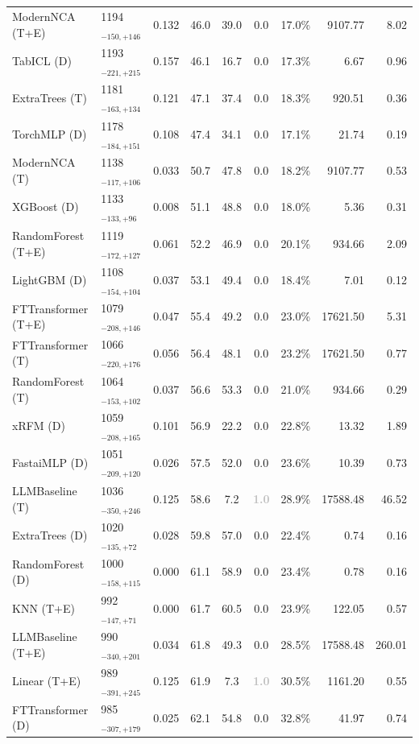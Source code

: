 \begin{tabular}{llcccccrr}
ModernNCA (T+E) & 1194${}_{-150,+146}$ & 0.132 & 46.0 & 39.0 & 0.0 & 17.0\% & 9107.77 & 8.02 \\
TabICL (D) & 1193${}_{-221,+215}$ & 0.157 & 46.1 & 16.7 & 0.0 & 17.3\% & 6.67 & 0.96 \\
ExtraTrees (T) & 1181${}_{-163,+134}$ & 0.121 & 47.1 & 37.4 & 0.0 & 18.3\% & 920.51 & 0.36 \\
TorchMLP (D) & 1178${}_{-184,+151}$ & 0.108 & 47.4 & 34.1 & 0.0 & 17.1\% & 21.74 & 0.19 \\
ModernNCA (T) & 1138${}_{-117,+106}$ & 0.033 & 50.7 & 47.8 & 0.0 & 18.2\% & 9107.77 & 0.53 \\
XGBoost (D) & 1133${}_{-133,+96}$ & 0.008 & 51.1 & 48.8 & 0.0 & 18.0\% & 5.36 & 0.31 \\
RandomForest (T+E) & 1119${}_{-172,+127}$ & 0.061 & 52.2 & 46.9 & 0.0 & 20.1\% & 934.66 & 2.09 \\
LightGBM (D) & 1108${}_{-154,+104}$ & 0.037 & 53.1 & 49.4 & 0.0 & 18.4\% & 7.01 & 0.12 \\
FTTransformer (T+E) & 1079${}_{-208,+146}$ & 0.047 & 55.4 & 49.2 & 0.0 & 23.0\% & 17621.50 & 5.31 \\
FTTransformer (T) & 1066${}_{-220,+176}$ & 0.056 & 56.4 & 48.1 & 0.0 & 23.2\% & 17621.50 & 0.77 \\
RandomForest (T) & 1064${}_{-153,+102}$ & 0.037 & 56.6 & 53.3 & 0.0 & 21.0\% & 934.66 & 0.29 \\
xRFM (D) & 1059${}_{-208,+165}$ & 0.101 & 56.9 & 22.2 & 0.0 & 22.8\% & 13.32 & 1.89 \\
FastaiMLP (D) & 1051${}_{-209,+120}$ & 0.026 & 57.5 & 52.0 & 0.0 & 23.6\% & 10.39 & 0.73 \\
LLMBaseline (T) & 1036${}_{-350,+246}$ & 0.125 & 58.6 & 7.2 & \textcolor{silver}{\textbf{1.0}} & 28.9\% & 17588.48 & 46.52 \\
ExtraTrees (D) & 1020${}_{-135,+72}$ & 0.028 & 59.8 & 57.0 & 0.0 & 22.4\% & 0.74 & 0.16 \\
RandomForest (D) & 1000${}_{-158,+115}$ & 0.000 & 61.1 & 58.9 & 0.0 & 23.4\% & 0.78 & 0.16 \\
KNN (T+E) & 992${}_{-147,+71}$ & 0.000 & 61.7 & 60.5 & 0.0 & 23.9\% & 122.05 & 0.57 \\
LLMBaseline (T+E) & 990${}_{-340,+201}$ & 0.034 & 61.8 & 49.3 & 0.0 & 28.5\% & 17588.48 & 260.01 \\
Linear (T+E) & 989${}_{-391,+245}$ & 0.125 & 61.9 & 7.3 & \textcolor{silver}{\textbf{1.0}} & 30.5\% & 1161.20 & 0.55 \\
FTTransformer (D) & 985${}_{-307,+179}$ & 0.025 & 62.1 & 54.8 & 0.0 & 32.8\% & 41.97 & 0.74 \\

\end{tabular}

